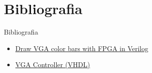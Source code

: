 \section{Bibliografia} %

\begin{frame}{Bibliografia} 
	\begin{itemize}
        \item \href{https://www.element14.com/community/thread/23394/l/draw-vga-color-bars-with-fpga-in-verilog}{Draw VGA color bars with FPGA in Verilog}
        \item \href{https://eewiki.net/pages/viewpage.action?pageId=15925278}{VGA Controller (VHDL)}
	\end{itemize}
\end{frame}


\begin{frame}
	\titlepage
\end{frame} 


